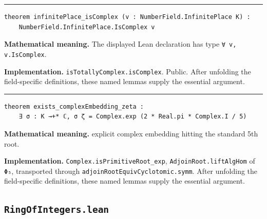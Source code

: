 \documentclass[UTF8,a4paper,11pt,fontset=fandol]{ctexart}
\theoremstyle{definition}
\newcommand{\statementsep}{\par\medskip\hrule\medskip}
\begin{document}
\statementsep
\begin{verbatim}
theorem infinitePlace_isComplex (v : NumberField.InfinitePlace K) :
    NumberField.InfinitePlace.IsComplex v
\end{verbatim}
\noindent\textbf{Mathematical meaning.} The displayed Lean declaration has type \texttt{∀ v, v.\allowbreak{}IsComplex}.\par
\noindent\textbf{Implementation.} \texttt{isTotallyComplex.\allowbreak{}isComplex}. Public. After unfolding the field-specific definitions, these named lemmas supply the essential argument.\par
\statementsep
\begin{verbatim}
theorem exists_complexEmbedding_zeta :
    ∃ σ : K →+* ℂ, σ ζ = Complex.exp (2 * Real.pi * Complex.I / 5)
\end{verbatim}
\noindent\textbf{Mathematical meaning.} explicit complex embedding hitting the standard 5th root.\par
\noindent\textbf{Implementation.} \texttt{Complex.\allowbreak{}isPrimitiveRoot\_\allowbreak{}exp}, \texttt{AdjoinRoot.\allowbreak{}liftAlgHom} of \texttt{Φ₅}, transported through \texttt{adjoinRootEquivCyclotomic.\allowbreak{}symm}. After unfolding the field-specific definitions, these named lemmas supply the essential argument.\par

\subsection{\texttt{RingOfIntegers.lean}}
\end{document}
